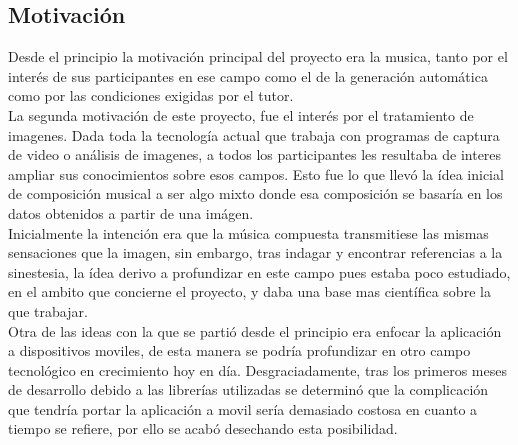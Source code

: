 \subsection{Motivación}



Desde el principio la motivación principal del proyecto era la musica, tanto por el interés de sus participantes en ese campo como el de la generación automática como por las condiciones exigidas por el tutor.\\

La segunda motivación de este proyecto, fue el interés por el tratamiento de imagenes. Dada toda la tecnología actual que trabaja con programas de captura de video o análisis de imagenes, a todos los participantes les resultaba de interes ampliar sus conocimientos sobre esos campos. Esto fue lo que llevó la ídea inicial de composición musical a ser algo mixto donde esa composición se basaría en los datos obtenidos a partir de una imágen.
\\Inicialmente la intención era que la música compuesta transmitiese las mismas sensaciones que la imagen, sin embargo, tras indagar y encontrar referencias a la sinestesia, la ídea derivo a profundizar en este campo pues estaba poco estudiado, en el ambito que concierne el proyecto, y daba una base mas científica sobre la que trabajar.\\

Otra de las ideas con la que se partió desde el principio era enfocar la aplicación a dispositivos moviles, de esta manera se podría profundizar en otro campo tecnológico en crecimiento hoy en día. Desgraciadamente, tras los primeros meses de desarrollo debido a las librerías utilizadas
se determinó que la complicación que tendría portar la aplicación a movil sería demasiado costosa en cuanto a tiempo se refiere, por ello se acabó desechando esta posibilidad.\\


